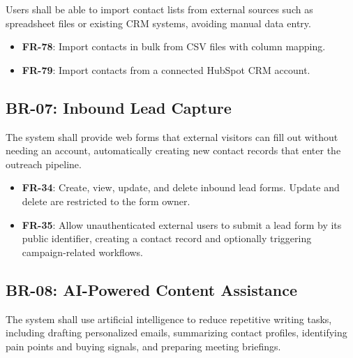 \documentclass[a4paper]{article}
\begin{document}
Users shall be able to import contact lists from external sources
such as spreadsheet files or existing CRM systems, avoiding manual
data entry.

\begin{itemize}
    \item \textbf{FR-78}: Import contacts in bulk from CSV files
    with column mapping.
    \item \textbf{FR-79}: Import contacts from a connected HubSpot
    CRM account.
\end{itemize}

\subsection{BR-07: Inbound Lead Capture}

The system shall provide web forms that external visitors can fill
out without needing an account, automatically creating new contact
records that enter the outreach pipeline.

\begin{itemize}
    \item \textbf{FR-34}: Create, view, update, and delete inbound
    lead forms. Update and delete are restricted to the form owner.
    \item \textbf{FR-35}: Allow unauthenticated external users to
    submit a lead form by its public identifier, creating a contact
    record and optionally triggering campaign-related workflows.
\end{itemize}

\subsection{BR-08: AI-Powered Content Assistance}

The system shall use artificial intelligence to reduce repetitive
writing tasks, including drafting personalized emails, summarizing
contact profiles, identifying pain points and buying signals, and
preparing meeting briefings.
\end{document}
